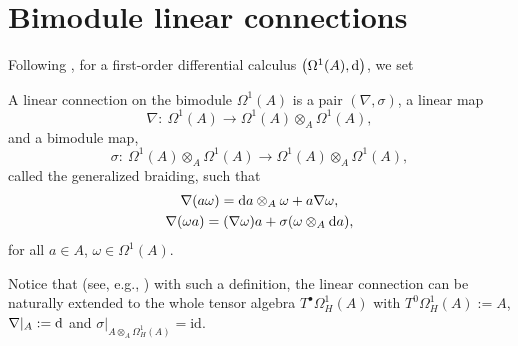 \documentclass[10pt,a4paper]{amsart}
\numberwithin{equation}{section}
\begin{document}
\section{Bimodule linear connections}
Following \cite{BM14}, for a first-order differential calculus $\big(\Omega^1(A),{\rm d}\big)$, we set
\begin{Definition}\label{lincon}
A linear connection on the bimodule $\Omega^1(A)$ is a pair $(\nabla, \sigma)$, a linear map
\begin{equation*}
\nabla\colon \ \Omega^1(A)\rightarrow \Omega^1(A)\otimes_A\Omega^1(A),
\end{equation*}
and a bimodule map,
\begin{equation*}
\sigma\colon \ \Omega^1(A)\otimes_A\Omega^1(A)\rightarrow \Omega^1(A)\otimes_A \Omega^1(A),
\end{equation*}
called the generalized braiding, such that
\begin{gather*}
\nabla(a\omega)={\rm d}a\otimes_A\omega +a\nabla\omega, \nonumber\\
\nabla(\omega a)=(\nabla \omega)a +\sigma (\omega\otimes_A {\rm d}a),%
\end{gather*}
for all $a\in A$, $\omega\in \Omega^1(A)$.
\end{Definition}
Notice that (see, e.g., \cite[Proposition~2.1.3]{BM11}) with such a definition, the linear connection can be naturally extended to the whole tensor algebra $T^\bullet\Omega_H^1(A)$ with $T^0\Omega_H^1(A):=A$, $\nabla|_{A}:={\rm d}$ and $\sigma|_{A\otimes_A \Omega_H^1(A)}=\mathrm{id}$.
\end{document}
